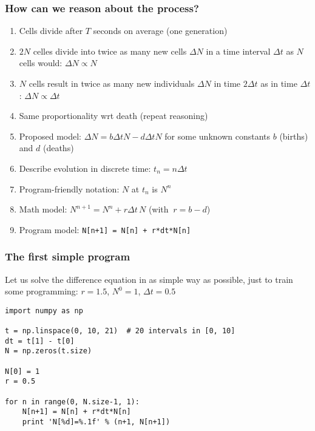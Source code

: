 \documentclass{beamer}
\begin{document}
\begin{frame}
\frametitle{How can we reason about the process?}


\begin{block}{}
\begin{enumerate}
\pause
\item Cells divide after $T$ seconds on average (one generation)

\pause
\item $2N$ celles divide into twice as many new cells $\Delta N$ in a time
   interval $\Delta t$ as $N$ cells would: $\Delta N \propto N$

\pause
\item $N$ cells result in twice as many new individuals $\Delta N$ in
   time $2\Delta t$ as in time $\Delta t$: $\Delta N \propto\Delta t$

\pause
\item Same proportionality wrt death (repeat reasoning)

\pause
\item Proposed model: $\Delta N = b\Delta t N - d\Delta tN$ for some unknown
   constants $b$ (births) and $d$ (deaths)

\pause
\item Describe evolution in discrete time: $t_n=n\Delta t$

\pause
\item Program-friendly notation: $N$ at $t_n$ is $N^n$

\pause
\item Math model: $N^{n+1} = N^n + r\Delta t\, N$ (with $\ r=b-d$)

\pause
\item Program model: \Verb!N[n+1] = N[n] + r*dt*N[n]!
\end{enumerate}

\noindent
\end{block}
\end{frame}

\begin{frame}
\frametitle{The first simple program}

\begin{block}{}
Let us solve the difference equation in as simple way as possible,
just to train some programming: $r=1.5$, $N^0=1$, $\Delta t=0.5$

\begin{verbatim}
import numpy as np

t = np.linspace(0, 10, 21)  # 20 intervals in [0, 10]
dt = t[1] - t[0]
N = np.zeros(t.size)

N[0] = 1
r = 0.5

for n in range(0, N.size-1, 1):
    N[n+1] = N[n] + r*dt*N[n]
    print 'N[%d]=%.1f' % (n+1, N[n+1])
\end{verbatim}
\end{block}
\end{frame}
\end{document}
